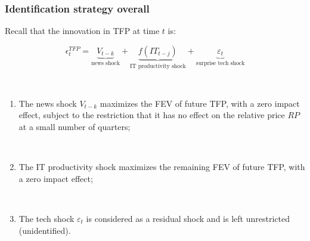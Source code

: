 \documentclass{beamer}
\begin{document}
\begin{frame}
	\frametitle{Identification strategy overall}

Recall that the innovation in TFP at time $t$ is:

\begin{equation*}
\epsilon^{TFP}_t =   \underbrace{V_{t-k}}_\text{news shock} + \underbrace{f(IT_{t-j})}_\text{IT productivity shock}  + \underbrace{\varepsilon_t}_\text{surprise tech shock} 
\end{equation*}

\

    \begin{enumerate}
    	\item The news shock $V_{t-k}$ maximizes the FEV of future TFP, with a zero impact effect, subject to the restriction that it has no effect on the relative price $RP$ at a small number of quarters;
	
	\
	
    \item The IT productivity shock maximizes the remaining FEV of future TFP, with a zero impact effect;
    
    \
    
    \item The tech shock $\varepsilon_t$ is considered as a residual shock and is left unrestricted (unidentified).
   \end{enumerate}
	
	
\end{frame}
\end{document}
